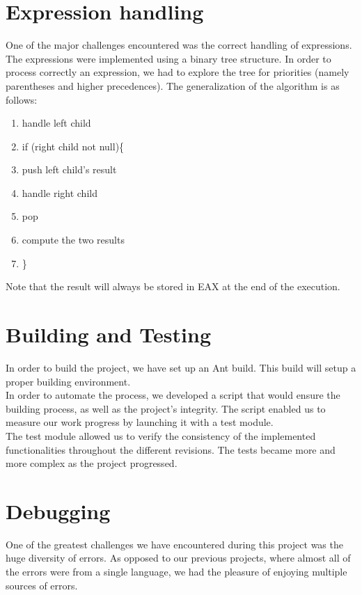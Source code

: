 \documentclass{article}
\begin{document}
\section{Expression handling}
One of the major challenges encountered was the correct handling of expressions.
The expressions were implemented using a binary tree structure. In order to process correctly an expression, we had to explore the tree for priorities (namely parentheses and higher precedences). The generalization of the algorithm is as follows:

\begin{enumerate}
\item handle left child
\item if (right child not null)\{
\item   push left child's result
\item   handle right child
\item   pop
\item   compute the two results
\item \}
\end{enumerate}

Note that the result will always be stored in EAX at the end of the execution.

\section{Building and Testing}
In order to build the project, we have set up an Ant build. This build will setup a proper building environment.\\
In order to automate the process, we developed a script that would ensure the building process, as well as the project's integrity. The script enabled us to measure our work progress by launching it with a test module.\\
The test module allowed us to verify the consistency of the implemented functionalities throughout the different revisions. The tests became more and more complex as the project progressed.

\section{Debugging}
One of the greatest challenges we have encountered during this project was the huge diversity of errors. As opposed to our previous projects, where almost all of the errors were from a single language, we had the pleasure of enjoying multiple sources of errors.\\
\end{document}
